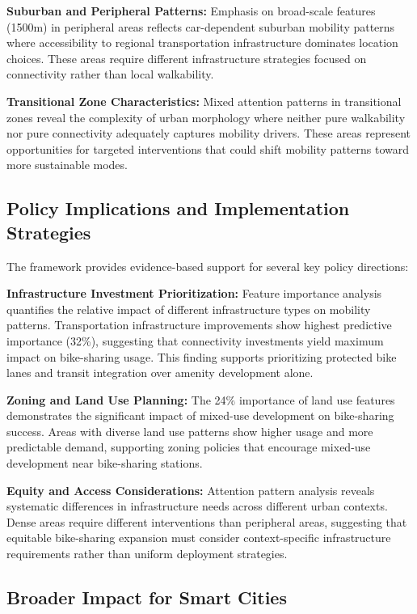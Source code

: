 \documentclass[sigconf,review,nonacm]{acmart}
\begin{document}
\textbf{Suburban and Peripheral Patterns:}
Emphasis on broad-scale features (1500m) in peripheral areas reflects car-dependent suburban mobility patterns where accessibility to regional transportation infrastructure dominates location choices. These areas require different infrastructure strategies focused on connectivity rather than local walkability.

\textbf{Transitional Zone Characteristics:}
Mixed attention patterns in transitional zones reveal the complexity of urban morphology where neither pure walkability nor pure connectivity adequately captures mobility drivers. These areas represent opportunities for targeted interventions that could shift mobility patterns toward more sustainable modes.

\subsection{Policy Implications and Implementation Strategies}

The framework provides evidence-based support for several key policy directions:

\textbf{Infrastructure Investment Prioritization:}
Feature importance analysis quantifies the relative impact of different infrastructure types on mobility patterns. Transportation infrastructure improvements show highest predictive importance (32\%), suggesting that connectivity investments yield maximum impact on bike-sharing usage. This finding supports prioritizing protected bike lanes and transit integration over amenity development alone.

\textbf{Zoning and Land Use Planning:}
The 24\% importance of land use features demonstrates the significant impact of mixed-use development on bike-sharing success. Areas with diverse land use patterns show higher usage and more predictable demand, supporting zoning policies that encourage mixed-use development near bike-sharing stations.

\textbf{Equity and Access Considerations:}
Attention pattern analysis reveals systematic differences in infrastructure needs across different urban contexts. Dense areas require different interventions than peripheral areas, suggesting that equitable bike-sharing expansion must consider context-specific infrastructure requirements rather than uniform deployment strategies.

\subsection{Broader Impact for Smart Cities}
\end{document}
